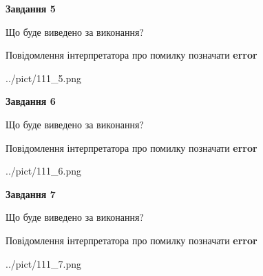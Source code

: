 \documentclass[10pt, ukrainian]{article}
\begin{document}
{\begin {large}
{\begin {center}\textbf{Завдання 5}\end {center}}\par
Що буде виведено за виконання? \par
Повідомлення інтерпретатора про помилку позначати \textbf{error}

\begin{center}
	{../pict/111_5.png}
\end{center}
\newpage

{\begin {center}\textbf{Завдання 6}\end {center}}\par
Що буде виведено за виконання? \par
Повідомлення інтерпретатора про помилку позначати \textbf{error}

\begin{center}
	{../pict/111_6.png}
\end{center}
\newpage

{\begin {center}\textbf{Завдання 7}\end {center}}\par
Що буде виведено за виконання? \par
Повідомлення інтерпретатора про помилку позначати \textbf{error}

\begin{center}
	{../pict/111_7.png}
\end{center}
\newpage

\end {large}}
\end{document}
